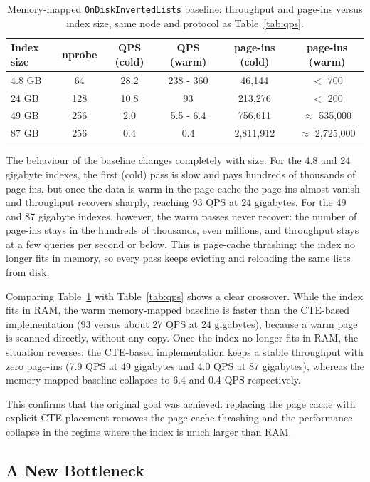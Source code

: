 \documentclass[11pt]{article}
\begin{document}
\begin{table}[h]
\centering
\begin{tabular}{lccccc}
\toprule
Index size & nprobe & QPS (cold) & QPS (warm) & page-ins (cold) & page-ins (warm) \\
\midrule
4.8 GB & 64  & 28.2 & 238 - 360 & 46{,}144      & $<$ 700 \\
24 GB  & 128 & 10.8 & 93        & 213{,}276     & $<$ 200 \\
49 GB  & 256 & 2.0  & 5.5 - 6.4 & 756{,}611     & $\approx$ 535{,}000 \\
87 GB  & 256 & 0.4  & 0.4       & 2{,}811{,}912 & $\approx$ 2{,}725{,}000 \\
\bottomrule
\end{tabular}
\caption{Memory-mapped \texttt{OnDiskInvertedLists} baseline: throughput and
page-ins versus index size, same node and protocol as Table~\ref{tab:qps}.}
\label{tab:mmap}
\end{table}

The behaviour of the baseline changes completely with size. For the 4.8 and 24
gigabyte indexes, the first (cold) pass is slow and pays hundreds of thousands
of page-ins, but once the data is warm in the page cache the page-ins almost
vanish and throughput recovers sharply, reaching 93 QPS at 24 gigabytes. For
the 49 and 87 gigabyte indexes, however, the warm passes never recover: the
number of page-ins stays in the hundreds of thousands, even millions, and
throughput stays at a few queries per second or below. This is page-cache
thrashing: the index no longer fits in memory, so every pass keeps evicting and
reloading the same lists from disk.

Comparing Table~\ref{tab:mmap} with Table~\ref{tab:qps} shows a clear
crossover. While the index fits in RAM, the warm memory-mapped baseline is
faster than the CTE-based implementation (93 versus about 27 QPS at 24
gigabytes), because a warm page is scanned directly, without any copy. Once the
index no longer fits in RAM, the situation reverses: the CTE-based
implementation keeps a stable throughput with zero page-ins (7.9 QPS at 49
gigabytes and 4.0 QPS at 87 gigabytes), whereas the memory-mapped baseline
collapses to 6.4 and 0.4 QPS respectively.

This confirms that the original goal was achieved: replacing the page
cache with explicit CTE placement removes the page-cache thrashing and
the performance collapse in the regime where the index is much larger
than RAM.

\subsection{A New Bottleneck}
\end{document}
